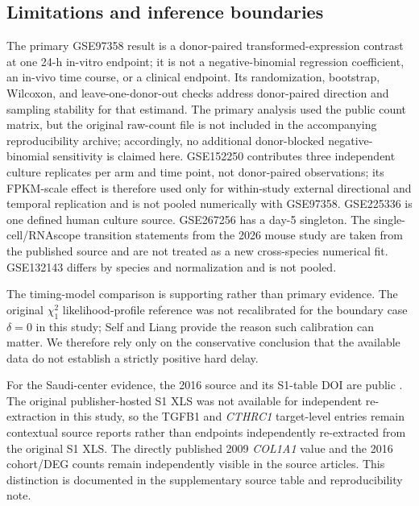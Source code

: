 \documentclass[preprint,11pt]{elsarticle}
\newcommand{\cthrc}{\textit{CTHRC1}}
\begin{document}
\subsection{Limitations and inference boundaries}
The primary GSE97358 result is a donor-paired transformed-expression contrast at one 24-h in-vitro endpoint; it is not a negative-binomial regression coefficient, an in-vivo time course, or a clinical endpoint. Its randomization, bootstrap, Wilcoxon, and leave-one-donor-out checks address donor-paired direction and sampling stability for that estimand. The primary analysis used the public count matrix, but the original raw-count file is not included in the accompanying reproducibility archive; accordingly, no additional donor-blocked negative-binomial sensitivity is claimed here. GSE152250 contributes three independent culture replicates per arm and time point, not donor-paired observations; its FPKM-scale effect is therefore used only for within-study external directional and temporal replication and is not pooled numerically with GSE97358. GSE225336 is one defined human culture source. GSE267256 has a day-5 singleton. The single-cell/RNAscope transition statements from the 2026 mouse study are taken from the published source and are not treated as a new cross-species numerical fit. GSE132143 differs by species and normalization and is not pooled.

The timing-model comparison is supporting rather than primary evidence. The original $\chi^2_1$ likelihood-profile reference was not recalibrated for the boundary case $\delta=0$ in this study; Self and Liang \cite{SelfLiang1987} provide the reason such calibration can matter. We therefore rely only on the conservative conclusion that the available data do not establish a strictly positive hard delay.

For the Saudi-center evidence, the 2016 source and its S1-table DOI are public \cite{Colak2016}. The original publisher-hosted S1 XLS was not available for independent re-extraction in this study, so the TGFB1 and \cthrc{} target-level entries remain contextual source reports rather than endpoints independently re-extracted from the original S1 XLS. The directly published 2009 \textit{COL1A1} value and the 2016 cohort/DEG counts remain independently visible in the source articles. This distinction is documented in the supplementary source table and reproducibility note.
\end{document}
